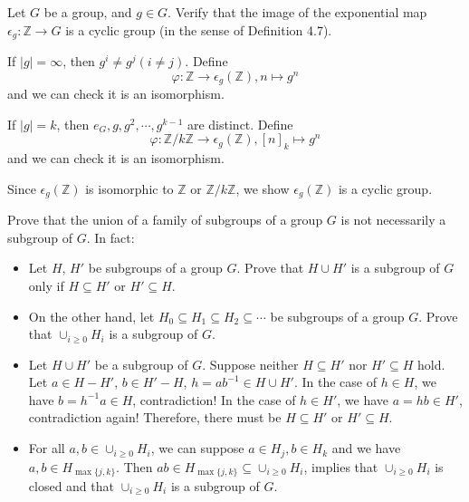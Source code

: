 \documentclass[12pt,letterpaper,boxed]{hmcpset}
\newcommand{\Z}{\mathbb{Z}}
\begin{document}
\begin{problem}[6.4]
Let $G$ be a group, and $g\in G$. Verify that the image of the exponential map
$\epsilon_g:\Z \rightarrow G$ is a cyclic group (in the sense of Definition 4.7).
\end{problem}
\begin{solution}
If $|g|=\infty$, then $g^i\ne g^j(i\ne j)$. Define
\[
\varphi:\Z\longrightarrow \epsilon_g(\Z),n\longmapsto g^n
\] 
and we can check it is an isomorphism.

\noindent If $|g|=k$, then $e_G,g,g^2,\cdots,g^{k-1}$ are distinct. Define
\[
\varphi:\Z/k\Z\longrightarrow \epsilon_g(\Z),[n]_k\longmapsto g^n
\]
and we can check it is an isomorphism. 

\noindent Since $\epsilon_g(\Z)$ is isomorphic to $\Z$ or $\Z/k\Z$, we show $\epsilon_g(\Z)$ is a cyclic group.
\end{solution}

\begin{problem}[6.6]
Prove that the union of a family of subgroups of a group $G$ is not necessarily
a subgroup of $G$. In fact:
\begin{itemize}
	\item Let $H$, $H'$ be subgroups of a group $G$. Prove that $H\cup H'$ is a subgroup of $G$ only if $H\subseteq H'$ or $H'\subseteq H$.
	\item On the other hand, let $H_0 \subseteq H_1 \subseteq H_2 \subseteq \cdots$ be subgroups of a group $G$. Prove that $\cup_{i\ge0}H_i$ is a subgroup of $G$.
\end{itemize}

\end{problem}
\begin{solution}
\begin{itemize}
	\item Let $H\cup H'$ be a subgroup of $G$. Suppose neither $H\subseteq H'$ nor $H'\subseteq H$ hold. Let $a\in H-H'$, $b\in H'-H$, $h=ab^{-1}\in H\cup H'$. In the case of $h\in H$, we have $b=h^{-1}a\in H$, contradiction! In the case of $h\in H'$, we have $a=hb\in H'$, contradiction again! Therefore, there must be $H\subseteq H'$ or $H'\subseteq H$.
	\item For all $a,b\in \cup_{i\ge0}H_i$, we can suppose $a\in H_j,b\in H_k$ and we have $a,b\in H_{\max\{j,k\}}$. Then $ab\in H_{\max\{j,k\}}\subseteq \cup_{i\ge0}H_i$, implies that $\cup_{i\ge0}H_i$ is closed and that $\cup_{i\ge0}H_i$ is a subgroup of $G$. 
\end{itemize}	
	
	
\end{solution}
\end{document}
